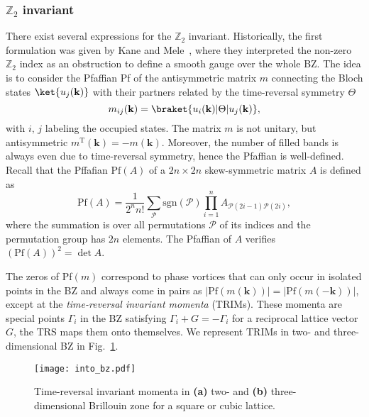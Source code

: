 \subsubsection{$\mathbb{Z}_2$ invariant}
There exist several expressions for the $\mathbb{Z}_2$ invariant. Historically, the first formulation was given by Kane and Mele~\cite{PhysRevLett.95.146802}, where they interpreted the non-zero $\mathbb{Z}_2$ index as an obstruction to define a smooth gauge over the whole BZ. The idea is to consider the Pfaffian Pf of the antisymmetric matrix $m$ connecting the Bloch states $\ket{u_j (\mathbf{k})}$ with their partners related by the time-reversal symmetry $\Theta$
\begin{equation}
m_{ij} ( \mathbf{k} ) = \braket{u_i ( \mathbf{k} ) | \Theta |  u_j (\mathbf{k}) },
\label{eq:z2_m-matrix}
\end{equation}
with $i, \, j$ labeling the occupied states. The matrix $m$ is not unitary, but antisymmetric $m^{\mathrm{T}} (\mathbf{k}) = - m (\mathbf{k})$. Moreover, the number of filled bands is always even due to time-reversal symmetry, hence the Pfaffian is well-defined. Recall that the Pffafian $\mathrm{Pf} (A)$ of a $2n \times 2n$ skew-symmetric matrix $A$ is defined as
\begin{equation}
 \mathrm{Pf} (A) = \frac{1}{2^n n!} \sum_{ \mathcal{P}} \mathrm{sgn} ( \mathcal{P} ) \prod_{i = 1}^n A_{\mathcal{P} ( 2i - 1) \mathcal{P} ( 2i)},
\end{equation}
where the summation is over all permutations $\mathcal{P}$ of its indices and the permutation group has $2n$ elements. The Pfaffian of $A$ verifies $( \mathrm{Pf} (A))^2 = \det A$. 

The zeros of Pf$(m)$ correspond to phase vortices that can only occur in isolated points in the BZ and always come in pairs as $|\mathrm{Pf} (m(\mathbf{k}))| = |\mathrm{Pf} (m(-\mathbf{k}))|$, except at the \emph{time-reversal invariant momenta} (TRIMs). These momenta are special points $\Gamma_i$ in the BZ satisfying $\Gamma_i + G = - \Gamma_i$ for a reciprocal lattice vector $G$, \ie the TRS maps them onto themselves. We represent TRIMs in two- and three-dimensional BZ in Fig.~\ref{fig:TRIMs}. 

\begin{figure}[H]
\centering
\texttt{[image: into\_bz.pdf]}
\caption[Time-reversal invariant momenta in two- and three-dimensional Brillouin zone]{Time-reversal invariant momenta in \textbf{(a)} two- and \textbf{(b)} three-dimensional Brillouin zone for a square or cubic lattice.}
\label{fig:TRIMs}
\end{figure}

